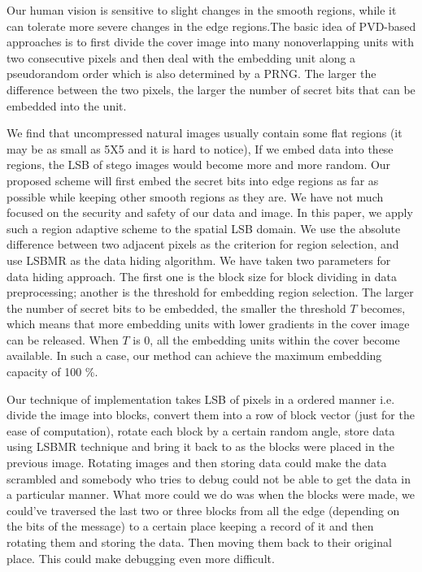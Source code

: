 \documentclass{report}
\begin{document}
\par
Our human vision is sensitive to slight changes in the smooth
regions, while it can tolerate more severe changes in the edge
regions.The
basic idea of PVD-based approaches is to first divide the cover
image into many nonoverlapping units with two consecutive
pixels and then deal with the embedding unit along a pseudorandom
order which is also determined by a PRNG.
The larger the difference between the two pixels, the larger the number of
secret bits that can be embedded into the unit.

\par We find that uncompressed natural images usually
contain some flat regions (it may be as small as 5X5 and it
is hard to notice), If we embed data into these regions, the LSB of stego images would become more and more random.
Our proposed scheme will first embed the secret bits into edge regions as far
as possible while keeping other smooth regions as they are.
We have not much focused on the security and safety of our data and image.
In this paper, we apply such a region adaptive scheme to the
spatial LSB domain. We use the absolute difference between
two adjacent pixels as the criterion for region selection, and use
LSBMR as the data hiding algorithm. We have taken two parameters for data hiding approach. The first one is the block size for block dividing in data preprocessing;
another is the threshold for embedding region selection.
The larger the
number of secret bits to be embedded, the smaller the threshold $T$
becomes, which means that more embedding units with
lower gradients in the cover image can be released.
When $T$ is 0, all the embedding units within the cover become
available. In such a case, our method can achieve the maximum
embedding capacity of 100 \%.

\par Our technique of implementation takes LSB of pixels in a ordered manner i.e. divide the image into blocks, convert them into a row of block vector (just for the ease of computation), rotate each block by a certain random angle, store data using LSBMR technique and bring it back to as the blocks were placed in the previous image.
Rotating images and then storing data could make the data scrambled and somebody who tries to debug could not be able to get the data in a particular manner.
What more could we do was when the blocks were made, we could’ve traversed the last two or three blocks from all the edge (depending on the bits of the message) to a certain place keeping a record of it and then rotating them and storing the data. Then moving them back to their original place.
This could make debugging even more difficult.
\newpage
\end{document}
